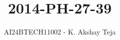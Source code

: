 \documentclass[journal,9pt,onecolumn]{IEEEtran}
\begin{document}

\vspace{3cm}
\title{2014-PH-27-39}
\author{AI24BTECH11002 - K. Akshay Teja}
\maketitle
 \bigskip
{\let\newpage\relax\maketitle}

\renewcommand{\thefigure}{\theenumi}
\renewcommand{\thetable}{\theenumi}
\setlength{\intextsep}{10pt} %

\renewcommand{\thetable}{\theenumi}
\end{document}
